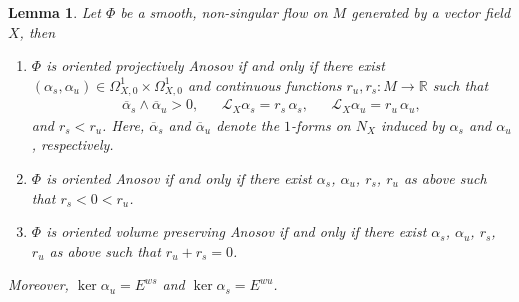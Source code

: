 \documentclass[letterpaper, 11pt]{article}
\numberwithin{equation}{section}
\newtheorem{lem}[thm]{Lemma}
\newcommand{\R}{\mathbb{R}}
\begin{document}
\begin{lem} \label{lem:anosovforms}
Let $\Phi$ be a smooth, non-singular flow on $M$ generated by a vector field $X$, then
\begin{enumerate}[label=(\arabic*)]
\item $\Phi$ is oriented projectively Anosov if and only if there exist $(\alpha_s, \alpha_u) \in \Omega^1_{X,0} \times \Omega^1_{X,0}$ and continuous functions $r_u, r_s : M \rightarrow \R$ such that
	\begin{align*}
	\overline{\alpha}_s \wedge \overline{\alpha}_u > 0, & & \mathcal{L}_X \alpha_s = r_s \, \alpha_s, & &\mathcal{L}_X \alpha_u = r_u \, \alpha_u,
	\end{align*}
	and $r_s < r_u$. Here, $\overline{\alpha}_s$ and $ \overline{\alpha}_u$ denote the $1$-forms on $N_X$ induced by $\alpha_s$ and $\alpha_u$, respectively.
\item $\Phi$ is oriented Anosov if and only if there exist $\alpha_s$, $\alpha_u$, $r_s$, $r_u$ as above such that $r_s < 0 < r_u$.
\item $\Phi$ is oriented volume preserving Anosov if and only if there exist $\alpha_s$, $\alpha_u$, $r_s$, $r_u$ as above such that $r_u + r_s = 0$.
\end{enumerate}
Moreover, $\ker \alpha_u = E^{ws}$ and $\ker \alpha_s = E^{wu}$.
\end{lem}
\end{document}
